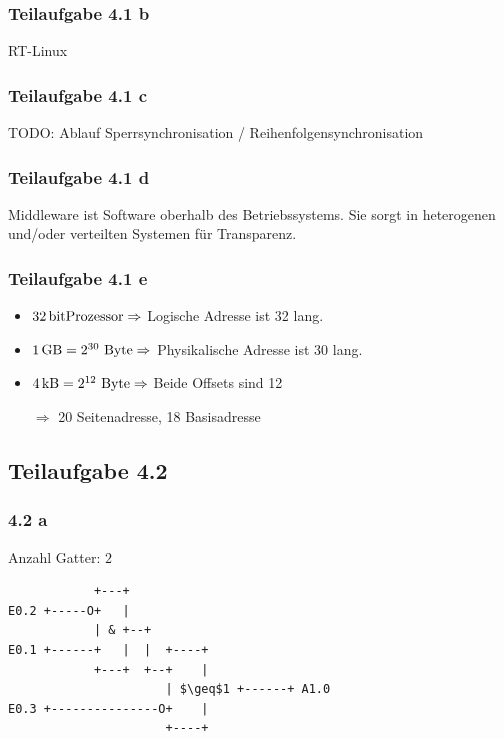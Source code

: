 \documentclass[a4paper]{scrartcl}
\begin{document}
  \subsubsection*{Teilaufgabe 4.1 b}
  RT-Linux  %

  \subsubsection*{Teilaufgabe 4.1 c}
  TODO: Ablauf Sperrsynchronisation / Reihenfolgensynchronisation

  \subsubsection*{Teilaufgabe 4.1 d}
  Middleware ist Software oberhalb des Betriebssystems. Sie sorgt in
  heterogenen und/oder verteilten Systemen für Transparenz.

  \subsubsection*{Teilaufgabe 4.1 e}
  \begin{itemize}
      \item $\SI{32}{\bit}\text{Prozessor} \Rightarrow$ Logische
            Adresse ist \SI{32}{\bit} lang.
      \item $\SI{1}{\giga\byte}=2^{30}\text{ Byte} \Rightarrow$ Physikalische
            Adresse ist \SI{30}{\bit} lang.
      \item $\SI{4}{\kilo\byte}=2^{12}\text{ Byte} \Rightarrow$ Beide Offsets
            sind \SI{12}{\bit}
      \item[$\Rightarrow$] \SI{20}{\bit} Seitenadresse, \SI{18}{\bit} Basisadresse
  \end{itemize}

  \subsection*{Teilaufgabe 4.2}
  \subsubsection*{4.2 a}
  Anzahl Gatter: $2$
  \begin{lstlisting}
            +---+
E0.2 +-----O+   |
            | & +--+
E0.1 +------+   |  |  +----+
            +---+  +--+    |
                      | $\geq$1 +------+ A1.0
E0.3 +---------------O+    |
                      +----+
  \end{lstlisting}
\end{document}
